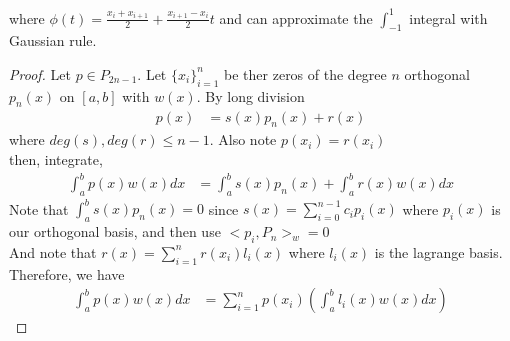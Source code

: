 \documentclass[11pt,oneside]{book}
\theoremstyle{break}
\theoremstyle{break}
\begin{document}
where $\phi(t)=\frac{x_i+x_{i+1}}{2}+\frac{x_{i+1}-x_{i}}{2}t$ and can approximate the $\int_{-1}^{1}$ integral with Gaussian rule.\begin{proof}
Let $p\in P_{2n-1}$. Let $\{x_i\}^{n}_{i=1}$ be ther zeros of the degree $n$ orthogonal $p_n(x)$ on $[a,b]$ with $w(x).$ By long division \begin{align*}
p(x)&=s(x)p_n(x)+r(x)
\end{align*}
 where $deg(s),deg(r)\leq n-1$. Also note $p(x_i)=r(x_i)$\\
 then, integrate, \begin{align*}
 \int_{a}^{b}p(x)w(x)dx &= \int_{a}^{b}s(x)p_n(x)+\int_{a}^{b}r(x)w(x)dx
 \end{align*}
 Note that $\int_{a}^{b}s(x)p_n(x)=0$ since $s(x)=\sum_{i=0}^{n-1}c_ip_i(x)$ where $p_i(x)$ is our orthogonal basis, and then use $<p_i,P_n>_w=0$\\
 And note that $r(x)=\sum_{i=1}^nr(x_i)l_i(x)$ where $l_i(x)$ is the lagrange basis. \\
 Therefore, we have \begin{align*}
  \int_{a}^{b}p(x)w(x)dx &=\sum_{i=1}^np(x_i)\left(\int_{a}^{b}l_i(x)w(x)dx \right)
 \end{align*}
\end{proof}
\end{document}
